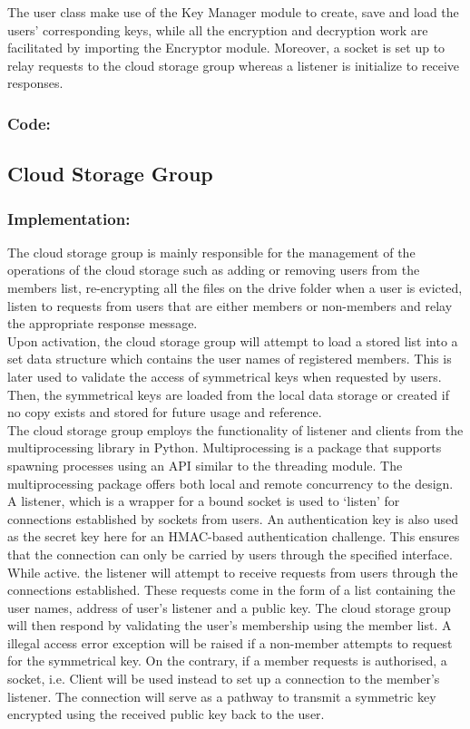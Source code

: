 \documentclass[12pt]{article}
\begin{document}
The user class make use of the Key Manager module to create, save and load the users' corresponding keys, while all the encryption and decryption work are facilitated by importing the Encryptor module. Moreover, a socket is set up to relay requests to the cloud storage group whereas a listener is initialize to receive responses. 
\newpage
\subsubsection*{Code:}

\newpage
\subsection*{Cloud Storage Group}
\subsubsection*{Implementation:}
The cloud storage group is mainly responsible for the management of the operations of the cloud storage such as adding or removing users from the members list, re-encrypting all the files on the drive folder when a user is evicted, listen to requests from users that are either members or non-members and relay the appropriate response message. \\

Upon activation, the cloud storage group will attempt to load a stored list into a set data structure which contains the user names of registered members. This is later used to validate the access of symmetrical keys when requested by users. Then, the symmetrical keys are loaded from the local data storage or created if no copy exists and stored for future usage and reference. \\ 

The cloud storage group employs the functionality of listener and clients from the multiprocessing library in Python. Multiprocessing is a package that supports spawning processes using an API similar to the threading module. The multiprocessing package offers both local and remote concurrency to the design. A listener, which is a wrapper for a bound socket is used to ‘listen’ for connections established by sockets from users. An authentication key is also used as the secret key here for an HMAC-based authentication challenge. This ensures that the connection can only be carried by users through the specified interface. \\

While active. the listener will attempt to receive requests from users through the connections established. These requests come in the form of a list containing the user names, address of user's listener and a public key. The cloud storage group will then respond by validating the user's membership using the member list. A illegal access error exception will be raised if a non-member attempts to request for the symmetrical key. On the contrary, if a member requests is authorised, a socket, i.e. Client will be used instead to set up a connection to the member's listener. The connection will serve as a pathway to transmit a symmetric key encrypted using the received public key back to the user. \\
\end{document}
